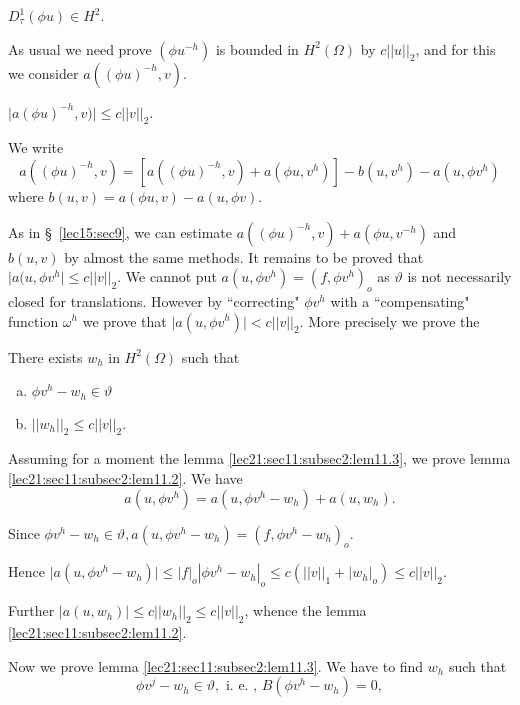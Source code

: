 \begin{step}\label{lec21:sec11:subsec2:step1} %
  $D^1_\tau (\phi u) \in H^2$. 
\end{step}

As usual we need prove $(\phi u ^{-h}) $ is bounded in $H^2 (\Omega)$
by $c || u ||_2$, and for this we consider $a ((\phi u)^{-h}, v)$.  

\begin{lemma}\label{lec21:sec11:subsec2:lem11.2}%
  $\big| a (\phi u)^{-h}, v) \big | \leq c || v ||_2$. 
\end{lemma}

We write
$$
a (( \phi u)^{-h}, v) = [a((\phi u )^{-h}, v) + a (\phi u, v^h)] -
b(u, v^h) - a(u, \phi v^h) 
$$
where $b(u, v) = a (\phi u, v) - a(u, \phi v)$. 

As in \S\ \ref{lec15:sec9}, we can estimate $a((\phi u)^{-h}, v) + a(\phi u,
v^{-h})$ and $b(u, v)$ by almost the same methods. It remains to be
proved that\pageoriginale $\big | a (u, \phi v^h \big | \leq c || v ||_2$. We cannot
put $a(u, \phi v^h) = (f, \phi v^h)_o$ as $\vartheta$ is not
necessarily closed for translations. However by ``correcting" $\phi
v^h$ with a ``compensating" function $\omega^h$ we prove that $\big |
a (u, \phi v^h) \big | < c || v ||_2$. More precisely we prove the  
\begin{lemma}\label{lec21:sec11:subsec2:lem11.3} %
  There exists $w_h$ in $H^2 (\Omega)$ such that
  \begin{enumerate} [(a)]
  \item $\phi v^h - w_h \in \vartheta$
  \item $|| w_h ||_2 \leq c || v ||_2$. 
  \end{enumerate}
\end{lemma}

Assuming for a moment the lemma \ref{lec21:sec11:subsec2:lem11.3}, we prove lemma \ref{lec21:sec11:subsec2:lem11.2}. We have 
$$
a(u, \phi v^h) = a(u, \phi v^h - w_h) + a(u, w_h). 
$$

Since $\phi v^h - w_h \in \vartheta, a (u, \phi v^h - w_h) =
(f, \phi v^h - w_h)_o$.  

Hence $\Big | a(u, \phi v^h - w_h ) \Big | \leq | f |_o | \phi v^h -
w_h |_o \leq c( || v||_1 + |w_h|_o ) \leq c || v ||_2$.  

Further $\Big | a (u, w_h) \Big | \leq c || w_h ||_2 \leq c|| v||_2$,
whence the lemma \ref{lec21:sec11:subsec2:lem11.2}.  

Now we prove lemma \ref{lec21:sec11:subsec2:lem11.3}. We have to find $w_h$ such that
$$
\phi v^j - w_h \in \vartheta, \text { i. e. , } B (\phi v^h - w_h) = 0, 
$$

